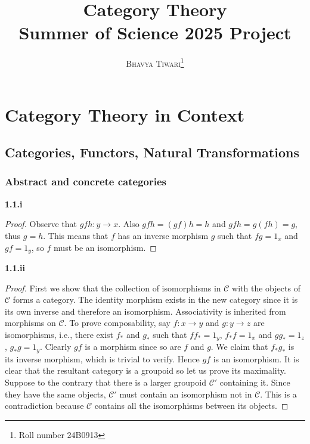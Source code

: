\documentclass{scrbook}
\author{\textsc{Bhavya Tiwari}\thanks{Roll number \textsc{24B0913}}}
\title{Category Theory \\[5mm]
\Large Summer of Science 2025 Project}
\newcommand{\hi}[1]{{\color{blue}\textbf{#1}}}
\begin{document}
\maketitle
\tableofcontents

\part{Category Theory in Context}
\chapter{Categories, Functors, Natural Transformations}
\section{Abstract and concrete categories}

\hi{1.1.i}
\begin{proof}
  Observe that $gfh : y \to x$. Also $gfh = (gf)h = h$ and
  $gfh = g(fh) = g$, thus $g = h$. This means that $f$ has an
  inverse morphism $g$ such that $fg = 1_x$ and $gf = 1_y$, so
  $f$ must be an isomorphism.
\end{proof}

\hi{1.1.ii}
\begin{proof}
  First we show that the collection of isomorphisms in
  $\mathcal{C}$ with the objects of $\mathcal{C}$ forms a
  category. The identity morphism exists in the new category
  since it is its own inverse and therefore an isomorphism.
  Associativity is inherited from morphisms on
  $\mathcal C$. To prove composability, say $f: x \to y$ and
  $g: y \to z$ are isomorphisms, i.e., there exist $f_*$ and
  $g_*$ such that $ff_* = 1_y$, $f_*f = 1_x$ and $gg_* = 1_z$,
  $g_*g = 1_y$.  Clearly $gf$ is a morphism since so are $f$
  and $g$. We claim that $f_*g_*$ is its inverse morphism,
  which is trivial to verify. Hence $gf$ is an isomorphism.
  It is clear that the resultant category is a groupoid so let
  us prove its maximality. Suppose to the contrary that there
  is a larger groupoid $\mathcal C'$ containing it. Since they have the same
  objects, $\mathcal C'$ must contain an isomorphism not in
  $\mathcal C$. This is a contradiction because $\mathcal C$
  contains all the isomorphisms between its objects.
  \end{proof}
\end{document}
